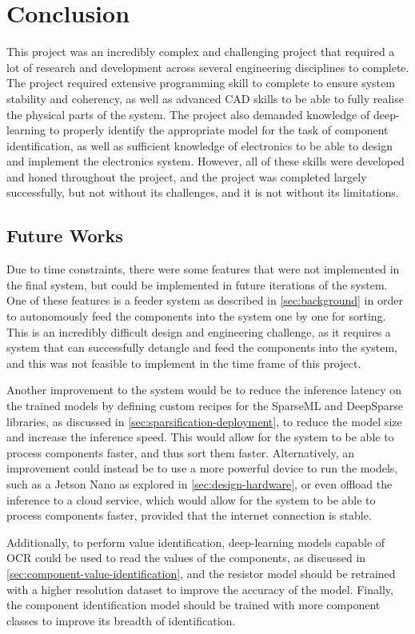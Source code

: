 \section{Conclusion}
\label{sec:conclusion}

This project was an incredibly complex and challenging project that required a lot of research and development across several engineering disciplines to complete. The project required extensive programming skill to complete to ensure system stability and coherency, as well as advanced CAD skills to be able to fully realise the physical parts of the system. The project also demanded knowledge of deep-learning to properly identify the appropriate model for the task of component identification, as well as sufficient knowledge of electronics to be able to design and implement the electronics system. However, all of these skills were developed and honed throughout the project, and the project was completed largely successfully, but not without its challenges, and it is not without its limitations.

\subsection{Future Works}
Due to time constraints, there were some features that were not implemented in the final system, but could be implemented in future iterations of the system. One of these features is a feeder system as described in \autoref{sec:background} in order to autonomously feed the components into the system one by one for sorting. This is an incredibly difficult design and engineering challenge, as it requires a system that can successfully detangle and feed the components into the system, and this was not feasible to implement in the time frame of this project.

Another improvement to the system would be to reduce the inference latency on the trained models by defining custom recipes for the SparseML and DeepSparse libraries, as discussed in \autoref{sec:sparsification-deployment}, to reduce the model size and increase the inference speed. This would allow for the system to be able to process components faster, and thus sort them faster. Alternatively, an improvement could instead be to use a more powerful device to run the models, such as a Jetson Nano as explored in \autoref{sec:design-hardware}, or even offload the inference to a cloud service, which would allow for the system to be able to process components faster, provided that the internet connection is stable.

Additionally, to perform value identification, deep-learning models capable of OCR could be used to read the values of the components, as discussed in \autoref{sec:component-value-identification}, and the resistor model should be retrained with a higher resolution dataset to improve the accuracy of the model. Finally, the component identification model should be trained with more component classes to improve its breadth of identification.
